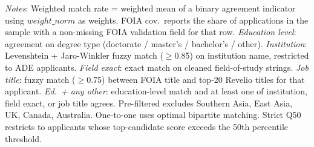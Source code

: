 \begin{table}[htbp]
\centering
\caption{Ex-Post Match Quality Across Sample Variants}
\label{tab:match_quality}
\footnotesize

\begin{tablenotes}
\item \textit{Notes}: Weighted match rate = weighted mean of a binary agreement indicator using $weight\_norm$ as weights. FOIA cov.\ reports the share of applications in the sample with a non-missing FOIA validation field for that row. \textit{Education level}: agreement on degree type (doctorate / master's / bachelor's / other). \textit{Institution}: Levenshtein + Jaro-Winkler fuzzy match ($\geq$0.85) on institution name, restricted to ADE applicants. \textit{Field exact}: exact match on cleaned field-of-study strings. \textit{Job title}: fuzzy match ($\geq$0.75) between FOIA title and top-20 Revelio titles for that applicant. \textit{Ed.\ + any other}: education-level match and at least one of institution, field exact, or job title agrees. Pre-filtered excludes Southern Asia, East Asia, UK, Canada, Australia. One-to-one uses optimal bipartite matching. Strict Q50 restricts to applicants whose top-candidate score exceeds the 50th percentile threshold.
\end{tablenotes}
\end{table}






